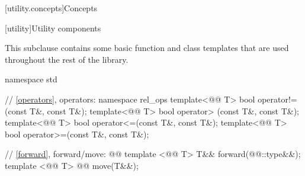 \documentclass[american,twoside]{book}
\begin{document}
[utility.concepts]{Concepts}


[utility]{Utility components}

\pnum
This subclause contains some basic function and class templates that are used
throughout the rest of the library.

%
%

\begin{codeblock}
namespace std {
  // \ref{operators}, operators:
  namespace rel_ops {
    template<@@ T> bool operator!=(const T&, const T&);
    template<@@ T> bool operator> (const T&, const T&);
    template<@@ T> bool operator<=(const T&, const T&);
    template<@@ T> bool operator>=(const T&, const T&);
  }

  // \ref{forward}, forward/move:
  @@
  template <@@ T> T&& forward(@@::type&&);
  template <@@ T> @@ move(T&&);

}
\end{codeblock}
\end{document}
